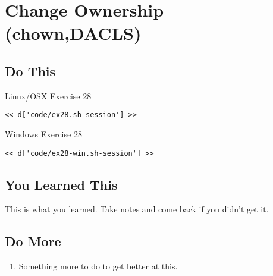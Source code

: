 \chapter{Change Ownership (chown,DACLS)}

\section{Do This}

\begin{code}{Linux/OSX Exercise 28}
\begin{Verbatim}
<< d['code/ex28.sh-session'] >>
\end{Verbatim}
\end{code}

\begin{code}{Windows Exercise 28}
\begin{Verbatim}
<< d['code/ex28-win.sh-session'] >>
\end{Verbatim}
\end{code}

\section{You Learned This}

This is what you learned.  Take notes and come back if you didn't get it.

\section{Do More}

\begin{enumerate}
\item Something more to do to get better at this.
\end{enumerate}

